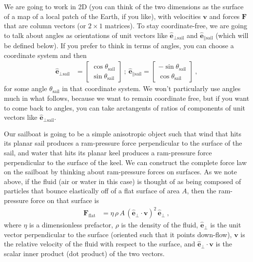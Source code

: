 \documentclass[letterpaper]{article}
\renewcommand{\vec}[1]{\boldsymbol{#1}}
\newcommand{\uvec}{\vec{\hat{e}}}
\renewcommand{\flat}{\text{flat}}
\newcommand{\sail}{\text{sail}}
\begin{document}
We are going to work in 2D (you can think of the two dimensions as the surface of a map of a local patch of the Earth, if you like), with velocities $\vec{v}$ and forces $\vec{F}$ that are column vectors (or $2\times 1$ matrices).
To stay coordinate-free, we are going to talk about angles as orientations of unit vectors like $\uvec_{\perp\sail}$ and $\uvec_{\parallel\sail}$ (which will be defined below).
If you prefer to think in terms of angles, you can choose a coordinate system and then
\begin{align}
    \uvec_{\perp\sail} &= \begin{bmatrix}\cos\theta_\sail \\ \sin\theta_\sail\end{bmatrix} ~ ; ~ \uvec_{\parallel\sail} = \begin{bmatrix}-\sin\theta_\sail \\ \cos\theta_\sail\end{bmatrix} ~,
\end{align}
for some angle $\theta_\sail$ in that coordinate system.
We won't particularly use angles much in what follows, because we want to remain coordinate free, but if you want to come back to angles, you can take arctangents of ratios of components of unit vectors like $\uvec_{\perp\sail}$.

Our sailboat is going to be a simple anisotropic object such that wind that hits its planar sail produces a ram-pressure force perpendicular to the surface of the sail,
and water that hits its planar keel produces a ram-pressure force perpendicular to the surface of the keel.
We can construct the complete force law on the sailboat by thinking about ram-pressure forces on surfaces.
As we note above, if the fluid (air or water in this case) is thought of as being composed of particles that bounce elastically off of a flat surface of area $A$, then the ram-pressure force on that surface is
\begin{align}\label{eq:flat}
    \vec{F}_\flat &= \eta\,\rho\,A\,(\uvec_\perp\cdot\vec{v})^2\,\uvec_\perp ~,
\end{align}
where $\eta$ is a dimensionless prefactor,
  $\rho$ is the density of the fluid,
  $\uvec_\perp$ is the unit vector perpendicular to the surface (oriented such that it points down-flow),
  $\vec{v}$ is the relative velocity of the fluid with respect to the surface,
  and $\uvec_\perp\cdot\vec{v}$ is the scalar inner product (dot product) of the two vectors.
\end{document}
